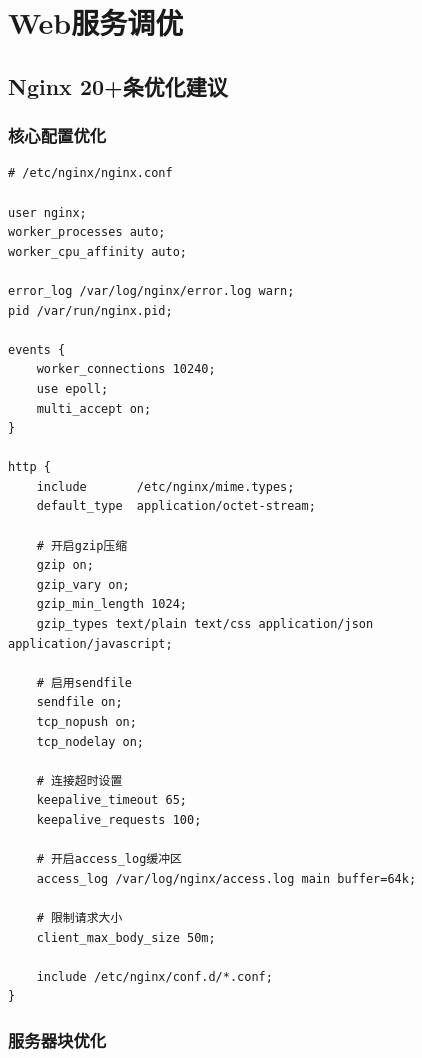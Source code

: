 \documentclass[12pt,UTF8]{ctexbook}
\begin{document}
\chapter{Web服务调优}
\label{chap:web-tuning}

\section{Nginx 20+条优化建议}
\label{sec:nginx-tuning}

\subsection*{核心配置优化}

\begin{lstlisting}
# /etc/nginx/nginx.conf

user nginx;
worker_processes auto;
worker_cpu_affinity auto;

error_log /var/log/nginx/error.log warn;
pid /var/run/nginx.pid;

events {
    worker_connections 10240;
    use epoll;
    multi_accept on;
}

http {
    include       /etc/nginx/mime.types;
    default_type  application/octet-stream;

    # 开启gzip压缩
    gzip on;
    gzip_vary on;
    gzip_min_length 1024;
    gzip_types text/plain text/css application/json application/javascript;

    # 启用sendfile
    sendfile on;
    tcp_nopush on;
    tcp_nodelay on;

    # 连接超时设置
    keepalive_timeout 65;
    keepalive_requests 100;

    # 开启access_log缓冲区
    access_log /var/log/nginx/access.log main buffer=64k;

    # 限制请求大小
    client_max_body_size 50m;

    include /etc/nginx/conf.d/*.conf;
}
\end{lstlisting}

\subsection*{服务器块优化}
\end{document}
